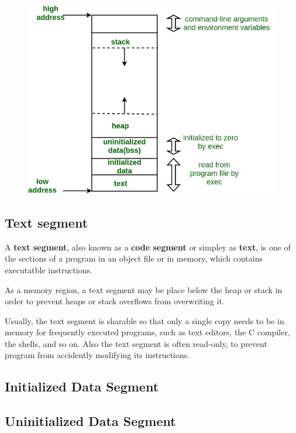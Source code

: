 \documentclass[a5paper,pagesize,10pt,bibtotoc,pointlessnumbers,
normalheadings,DIV=9,twoside=false]{scrbook}
\begin{document}
\begin{figure}[!htb]
	\centering
	\includegraphics[width=\textwidth]{pictures/memoryLayoutC.jpg}
\end{figure}

\subsection{Text segment}
A \textbf{text segment}, also known as a \textbf{code segment} or simpley as \textbf{text},
is one of the sections of a program in an object file or in memory,
which contains executatble instructions.

As a memory region, a text segment may be place below the heap or stack 
in order to prevent heaps or stack overflows from overwriting it.

Usually, the text segment is sharable so that only a single copy needs to be 
in memory for frequently executed programs, such as text editors, the C compiler, 
the shells, and so on. Also the text segment is often read-only, to prevent program
from accidently modifying its instructions.


\subsection{Initialized Data Segment}

\subsection{Uninitialized Data Segment}

\end{document}

